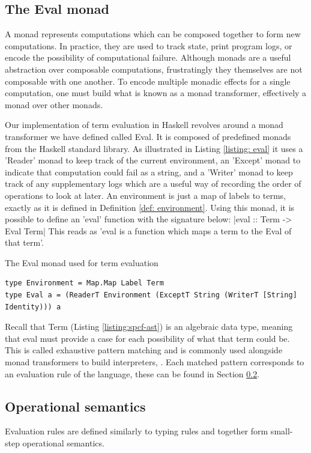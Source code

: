 \documentclass[12pt,a4paper]{report}
\theoremstyle{definition}
\theoremstyle{definition}
\theoremstyle{remark}
\begin{document}
\subsection{The Eval monad}
A monad represents computations which can be composed together to form new computations. In practice, they are used to track state, print program logs, or encode the possibility of computational failure. Although monads are a useful abstraction over composable computations, frustratingly they themselves are not composable with one another. To encode multiple monadic effects for a single computation, one must build what is known as a monad transformer, effectively a monad over other monads.

Our implementation of term evaluation in Haskell revolves around a monad transformer we have defined called Eval. It is composed of predefined monads from the Haskell standard library. As illustrated in Listing \ref{listing: eval} it uses a 'Reader' monad to keep track of the current environment, an 'Except' monad to indicate that computation could fail as a string, and a 'Writer' monad to keep track of any supplementary logs which are a useful way of recording the order of operations to look at later. An environment is just a map of labels to terms, exactly as it is defined in Definition \ref{def: environment}. Using this monad, it is possible to define an 'eval' function with the signature below:
|eval :: Term -> Eval Term|
This reads as 'eval is a function which maps a term to the Eval of that term'. 

\begin{listing}
\caption{The Eval monad used for term evaluation}
\begin{verbatim}
type Environment = Map.Map Label Term
type Eval a = (ReaderT Environment (ExceptT String (WriterT [String] Identity))) a
\end{verbatim}
\label{listing: eval}
\end{listing}

Recall that Term (Listing \ref{listing:spcf-ast}) is an algebraic data type, meaning that eval must provide a case for each possibility of what that term could be. This is called exhaustive pattern matching and is commonly used alongside monad transformers to build interpreters, \citep[\emph{e.g.},][]{Liang1995MonadTA}. Each matched pattern corresponds to an evaluation rule of the language, these can be found in Section \ref{section: op sem}.

\subsection{Operational semantics}\label{section: op sem}
Evaluation rules are defined similarly to typing rules and together form small-step operational semantics.
\end{document}
